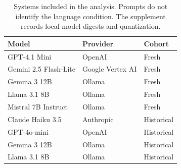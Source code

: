 \begin{table}[t]
\centering
\caption{Systems included in the analysis. Prompts do not identify the language condition. The supplement records local-model digests and quantization.}
\label{tab:model-systems}
\small
\setlength{\tabcolsep}{3pt}
\begin{tabular}{lll}
\toprule
Model & Provider & Cohort \\
\midrule
GPT-4.1 Mini & OpenAI & Fresh \\
Gemini 2.5 Flash-Lite & Google Vertex AI & Fresh \\
Gemma 3 12B & Ollama & Fresh \\
Llama 3.1 8B & Ollama & Fresh \\
Mistral 7B Instruct & Ollama & Fresh \\
Claude Haiku 3.5 & Anthropic & Historical \\
GPT-4o-mini & OpenAI & Historical \\
Gemma 3 12B & Ollama & Historical \\
Llama 3.1 8B & Ollama & Historical \\
\bottomrule
\end{tabular}
\end{table}
